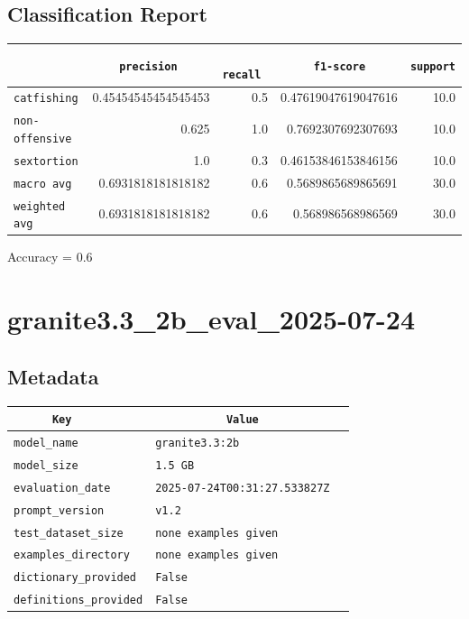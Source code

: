 \documentclass{article}
\begin{document}
\subsection{Classification Report}

\begin{center}
\begin{tabular}{l | r | r | r | r} \hline
    \verb|            | & \verb|    precision     | & \verb|      recall      | & \verb|     f1-score     | & \verb|support| \\ \hline
    \hline
    \verb|catfishing | & 0.45454545454545453 & 0.5 & 0.47619047619047616 &    10.0 \\ \hline
    \verb|non-offensive| & 0.625 & 1.0 & 0.7692307692307693 &    10.0 \\ \hline
    \verb|sextortion | & 1.0 & 0.3 & 0.46153846153846156 &    10.0 \\ \hline
    \verb|macro avg  | & 0.6931818181818182 & 0.6 & 0.5689865689865691 &    30.0 \\ \hline
    \verb|weighted avg| & 0.6931818181818182 & 0.6 & 0.568986568986569 &    30.0 \\ \hline
\end{tabular}
\end{center}

\begin{center}
Accuracy = 0.6
\end{center}

\section{granite3.3\_2b\_eval\_2025-07-24}
\subsection{Metadata}

\begin{center}
\begin{tabular}{l | l} \hline
    \verb|      Key      | & \verb|           Value           | \\ \hline
    \hline
    \verb|model_name    | & \verb|granite3.3:2b                | \\ \hline
    \verb|model_size    | & \verb|1.5 GB                       | \\ \hline
    \verb|evaluation_date| & \verb|2025-07-24T00:31:27.533827Z  | \\ \hline
    \verb|prompt_version| & \verb|v1.2                         | \\ \hline
    \verb|test_dataset_size| & \verb|none examples given          | \\ \hline
    \verb|examples_directory| & \verb|none examples given          | \\ \hline
    \verb|dictionary_provided| & \verb|False                        | \\ \hline
    \verb|definitions_provided| & \verb|False                        | \\ \hline
\end{tabular}
\end{center}
\end{document}
